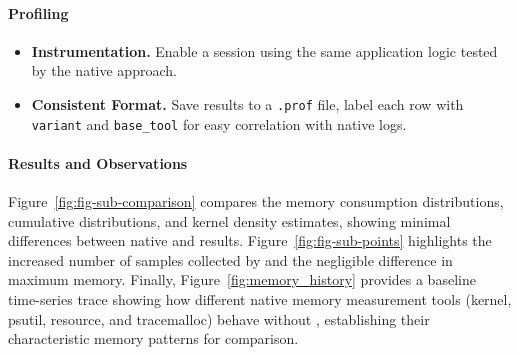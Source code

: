 \paragraph{\traceq Profiling}
\begin{itemize}

    \item \textbf{Instrumentation.} Enable a \traceq session using the same application logic tested by the native approach.

    \item \textbf{Consistent Format.} Save \traceq results to a \texttt{.prof} file, label each row with \texttt{variant} and \texttt{base\_tool} for easy correlation with native logs.

\end{itemize}

\paragraph{Results and Observations}
Figure~\ref{fig:fig-sub-comparison} compares the memory consumption distributions, cumulative distributions, and kernel density estimates, showing minimal differences between native and \traceq results.
Figure~\ref{fig:fig-sub-points} highlights the increased number of samples collected by \traceq and the negligible difference in maximum memory.
Finally, Figure~\ref{fig:memory_history} provides a baseline time-series trace showing how different native memory measurement tools (kernel, psutil, resource, and tracemalloc) behave without \traceq, establishing their characteristic memory patterns for comparison.

